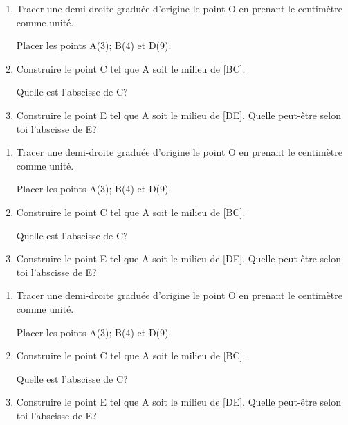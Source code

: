 \documentclass[a4paper]{book}
\begin{document}
    \begin{exercice}
        \begin{enumerate}
            \item Tracer une demi-droite graduée d'origine le point O en prenant le centimètre comme unité.
            
            Placer les points A(3); B(4) et D(9).

            \item Construire le point C tel que A soit le milieu de [BC].
            
            Quelle est l'abscisse de C?

            \item Construire le point E tel que A soit le milieu de [DE].
            Quelle peut-être selon toi l'abscisse de E?
        \end{enumerate}
    \end{exercice}


\bigskip


\setcounter{exo}{1}

    \begin{exercice}
        \begin{enumerate}
            \item Tracer une demi-droite graduée d'origine le point O en prenant le centimètre comme unité.
            
            Placer les points A(3); B(4) et D(9).

            \item Construire le point C tel que A soit le milieu de [BC].
            
            Quelle est l'abscisse de C?

            \item Construire le point E tel que A soit le milieu de [DE].
            Quelle peut-être selon toi l'abscisse de E?
        \end{enumerate}
    \end{exercice}


\bigskip


\setcounter{exo}{1}

    \begin{exercice}
        \begin{enumerate}
            \item Tracer une demi-droite graduée d'origine le point O en prenant le centimètre comme unité.
            
            Placer les points A(3); B(4) et D(9).

            \item Construire le point C tel que A soit le milieu de [BC].
            
            Quelle est l'abscisse de C?

            \item Construire le point E tel que A soit le milieu de [DE].
            Quelle peut-être selon toi l'abscisse de E?
        \end{enumerate}
    \end{exercice}
\end{document}

